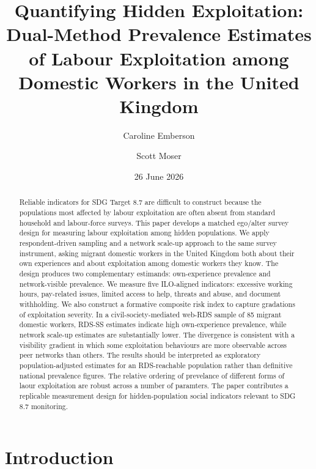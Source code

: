 \documentclass[
  12pt,
  letterpaper,
  DIV=11,
  numbers=noendperiod]{scrartcl}
\title{Quantifying Hidden Exploitation: Dual-Method Prevalence Estimates
of Labour Exploitation among Domestic Workers in the United Kingdom}
\author{Caroline Emberson \and Scott Moser}
\date{26 June 2026}
\begin{document}
\maketitle
\begin{abstract}
Reliable indicators for SDG Target 8.7 are difficult to construct
because the populations most affected by labour exploitation are often
absent from standard household and labour-force surveys. This paper
develops a matched ego/alter survey design for measuring labour
exploitation among hidden populations. We apply respondent-driven
sampling and a network scale-up approach to the same survey instrument,
asking migrant domestic workers in the United Kingdom both about their
own experiences and about exploitation among domestic workers they know.
The design produces two complementary estimands: own-experience
prevalence and network-visible prevalence. We measure five ILO-aligned
indicators: excessive working hours, pay-related issues, limited access
to help, threats and abuse, and document withholding. We also construct
a formative composite risk index to capture gradations of exploitation
severity. In a civil-society-mediated web-RDS sample of 85 migrant
domestic workers, RDS-SS estimates indicate high own-experience
prevalence, while network scale-up estimates are substantially lower.
The divergence is consistent with a visibility gradient in which some
exploitation behaviours are more observable across peer networks than
others. The results should be interpreted as exploratory
population-adjusted estimates for an RDS-reachable population rather
than definitive national prevalence figures. The relative ordering of
prevelance of different forms of laour exploitation are robust across a
number of paramters. The paper contributes a replicable measurement
design for hidden-population social indicators relevant to SDG 8.7
monitoring.
\end{abstract}


\section{Introduction}\label{sec-intro}
\end{document}
